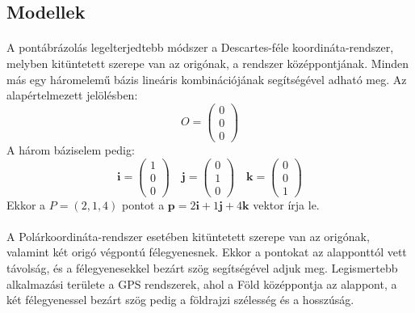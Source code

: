 \documentclass[12pt]{report}
\begin{document}
\subsection{Modellek}
\paragraph{}
A pontábrázolás legelterjedtebb módszer a Descartes-féle koordináta-rendszer, melyben kitüntetett szerepe van az origónak, a rendszer középpontjának. Minden más egy háromelemű bázis lineáris kombinációjának segítségével adható meg. Az alapértelmezett jelölésben:
$$
O = \left( \begin{array}{c} 0\\ 0\\ 0 \end{array} \right)
$$
A három báziselem pedig:
$$
\mathbf{i} = \left( \begin{array}{c} 1\\ 0\\ 0 \end{array} \right) \quad \mathbf{j} = \left( \begin{array}{c} 0\\ 1\\ 0 \end{array} \right) \quad \mathbf{k} = \left( \begin{array}{c} 0\\ 0\\ 1 \end{array} \right)
$$
Ekkor a $P = (2, 1, 4)$ pontot a $\mathbf{p} = 2 \mathbf{i} + 1 \mathbf{j} + 4 \mathbf{k}$ vektor írja le.
\paragraph{}
A Polárkoordináta-rendszer esetében kitüntetett szerepe van az origónak, valamint két origó végpontú félegyenesnek. Ekkor a pontokat az alapponttól vett távolság, és a félegyenesekkel bezárt szög segítségével adjuk meg. Legismertebb alkalmazási területe a GPS rendszerek, ahol a Föld középpontja az alappont, a két félegyenessel bezárt szög pedig a földrajzi szélesség és a hosszúság.
\end{document}
